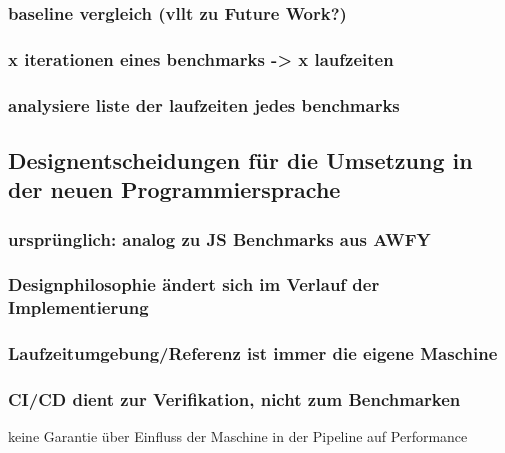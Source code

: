 \subsubsection{ baseline vergleich (vllt zu Future Work?) }
\subsubsection{ x iterationen eines benchmarks -> x laufzeiten  }
\subsubsection{ analysiere liste der laufzeiten jedes benchmarks }
    
\subsection{ Designentscheidungen für die Umsetzung in der neuen Programmiersprache }
\subsubsection{ ursprünglich: analog zu JS Benchmarks aus AWFY }
\subsubsection{ Designphilosophie ändert sich im Verlauf der Implementierung  }
\subsubsection{ Laufzeitumgebung/Referenz ist immer die eigene Maschine }
\subsubsection{CI/CD dient zur Verifikation, nicht zum Benchmarken  }
    {\rightarrow} keine Garantie über Einfluss der Maschine in der Pipeline auf Performance 
    